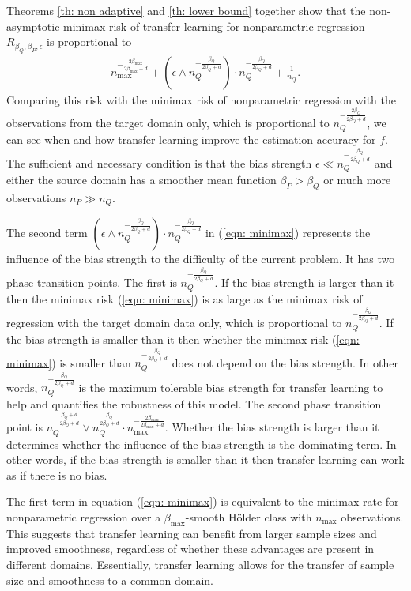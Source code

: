 \documentclass{article}
\def\holder{H\"{o}lder }
\def\bmax{\beta_{\max}}
\begin{document}
Theorems \ref{th: non adaptive} and \ref{th: lower bound} together show that the non-asymptotic minimax risk of  transfer learning for nonparametric regression $R_{\beta_Q,\beta_P,\epsilon}$ is proportional to
\begin{align}
n_{\max}^{-\frac{2\bmax}{2\bmax+d}}+ (\epsilon \wedge n_Q^{-\frac{\beta_Q}{2\beta_Q+d}})\cdot n_Q^{-\frac{\beta_Q}{2\beta_Q+d}}+\frac{1}{n_Q}.\label{eqn: minimax}
\end{align}
Comparing this risk with the minimax risk of nonparametric regression with the observations from the target domain only, which is proportional to $n_Q^{-\frac{2\beta_Q}{2\beta_Q+d}}$, we can see when and how transfer learning improve the estimation accuracy for $f$. The sufficient and necessary condition is that the bias strength $\epsilon\ll n_Q^{-\frac{\beta_Q}{2\beta_Q+d}}$  and either the source domain has  a smoother mean function $\beta_P>\beta_Q$ or much more observations $n_P\gg n_Q$. 

The second term $(\epsilon \wedge n_Q^{-\frac{\beta_Q}{2\beta_Q+d}})\cdot n_Q^{-\frac{\beta_Q}{2\beta_Q+d}}$ in (\ref{eqn: minimax})
represents the influence of the bias strength to the difficulty of the current problem. It has two phase transition points. The first is $n_Q^{-\frac{\beta_Q}{2\beta_Q+d}}$.  If the bias strength is larger than it then the minimax risk (\ref{eqn: minimax}) is as large as the minimax risk of regression with the target domain data only, which is proportional to $n_Q^{-\frac{\beta_Q}{2\beta_Q+d}}$. If the bias strength is smaller than it then whether the minimax risk (\ref{eqn: minimax}) is smaller than $n_Q^{-\frac{\beta_Q}{2\beta_Q+d}}$ does not depend on the bias strength. In other words, $n_Q^{-\frac{\beta_Q}{2\beta_Q+d}}$ is the maximum tolerable bias strength for transfer learning to help and quantifies the robustness of this model. The second phase transition point is $n_Q^{-\frac{\beta_Q+d}{2\beta_Q+d}}\vee n_Q^{\frac{\beta_Q}{2\beta_Q+d}}\cdot n_{\max}^{-\frac{2\beta_{\max}}{2\beta_{\max}+d}}$. Whether the bias strength is larger than it determines whether the influence of the bias strength is the dominating term. In other words, if the bias strength is smaller than it then transfer learning can work as if there is no bias.

The first term in equation (\ref{eqn: minimax}) is equivalent to the minimax rate for nonparametric regression over a $\beta_{\max}$-smooth \holder class with $n_{\max}$ observations. This suggests that transfer learning can benefit from larger sample sizes and improved smoothness, regardless of whether these advantages are present in different domains. Essentially, transfer learning allows for the transfer of sample size and smoothness to a common domain.
\end{document}
